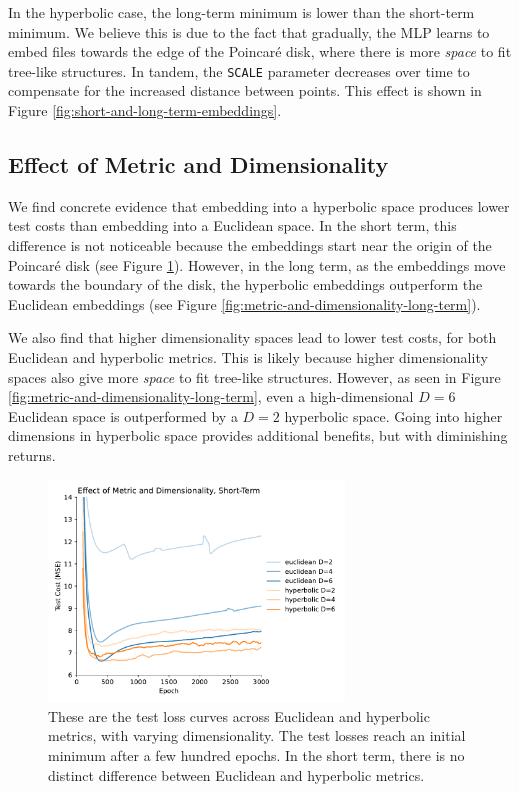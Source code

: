 \documentclass{article}
\begin{document}
In the hyperbolic case, the long-term minimum is lower than the short-term minimum. We believe this is due to the fact that gradually, the MLP learns to embed files towards the edge of the Poincaré disk, where there is more \emph{space} to fit tree-like structures. In tandem, the \texttt{SCALE} parameter decreases over time to compensate for the increased distance between points. This effect is shown in Figure \ref{fig:short-and-long-term-embeddings}.

\subsection{Effect of Metric and Dimensionality}

We find concrete evidence that embedding into a hyperbolic space produces lower test costs than embedding into a Euclidean space. In the short term, this difference is not noticeable because the embeddings start near the origin of the Poincaré disk (see Figure \ref{fig:metric-and-dimensionality-short-term}). However, in the long term, as the embeddings move towards the boundary of the disk, the hyperbolic embeddings outperform the Euclidean embeddings (see Figure \ref{fig:metric-and-dimensionality-long-term}).

We also find that higher dimensionality spaces lead to lower test costs, for both Euclidean and hyperbolic metrics. This is likely because higher dimensionality spaces also give more \emph{space} to fit tree-like structures. However, as seen in Figure \ref{fig:metric-and-dimensionality-long-term}, even a high-dimensional $D=6$ Euclidean space is outperformed by a $D=2$ hyperbolic space. Going into higher dimensions in hyperbolic space provides additional benefits, but with diminishing returns.

\begin{figure}[H]
  \centering
  \includegraphics[width=0.7\textwidth]{figures/metric_and_dimensionality_short_term.pdf}
  \caption{These are the test loss curves across Euclidean and hyperbolic metrics, with varying dimensionality. The test losses reach an initial minimum after a few hundred epochs. In the short term, there is no distinct difference between Euclidean and hyperbolic metrics.}
  \label{fig:metric-and-dimensionality-short-term}
\end{figure}
\end{document}
